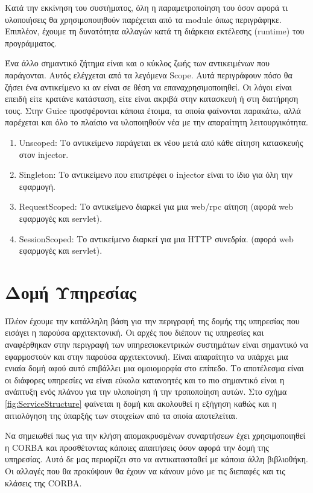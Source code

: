 Κατά την εκκίνηση του συστήματος, όλη η παραμετροποίηση του όσον αφορά 
τι υλοποιήσεις θα χρησιμοποιηθούν παρέχεται από τα module όπως 
περιγράφηκε. Επιπλέον, έχουμε τη δυνατότητα αλλαγών κατά τη διάρκεια 
εκτέλεσης (runtime) του προγράμματος.

Ένα άλλο σημαντικό ζήτημα είναι και ο κύκλος ζωής των αντικειμένων που 
παράγονται. Αυτός ελέγχεται από τα λεγόμενα Scope. Αυτά περιγράφουν πόσο 
θα ζήσει ένα αντικείμενο κι αν είναι σε θέση να επαναχρησιμοποιηθεί. Οι 
λόγοι είναι επειδή είτε κρατάνε κατάσταση, είτε είναι ακριβά στην 
κατασκευή ή στη διατήρηση τους. Στην Guice προσφέρονται κάποια έτοιμα, 
τα οποία φαίνονται παρακάτω, αλλά παρέχεται και όλο το πλαίσιο να 
υλοποιηθούν νέα με την απαραίτητη λειτουργικότητα.

\begin{enumerate}
\item Unscoped: Το αντικείμενο παράγεται εκ νέου μετά από κάθε αίτηση 
κατασκευής στον injector.
\item Singleton: Το αντικείμενο που επιστρέφει ο injector είναι το ίδιο 
για όλη την εφαρμογή.
\item RequestScoped: Το αντικείμενο διαρκεί για μια web/rpc αίτηση 
(αφορά web εφαρμογές και servlet).
\item SessionScoped: Το αντικείμενο διαρκεί για μια HTTP συνεδρία. 
(αφορά web εφαρμογές και servlet).
\setcounter{numberedCntE}{\theenumi}
\end{enumerate}

\section{Δομή Υπηρεσίας}

Πλέον έχουμε την κατάλληλη βάση για την περιγραφή της δομής της 
υπηρεσίας που εισάγει η παρούσα αρχιτεκτονική. Οι αρχές που διέπουν τις 
υπηρεσίες και αναφέρθηκαν στην περιγραφή των υπηρεσιοκεντρικών 
συστημάτων είναι σημαντικό να εφαρμοστούν και στην παρούσα 
αρχιτεκτονική. Είναι απαραίτητο να υπάρχει μια ενιαία δομή αφού αυτό 
επιβάλλει μια ομοιομορφία στο επίπεδο. Το αποτέλεσμα είναι οι διάφορες 
υπηρεσίες να είναι εύκολα κατανοητές και το πιο σημαντικό είναι η 
ανάπτυξη ενός πλάνου για την υλοποίηση ή την τροποποίηση αυτών. Στο σχήμα 
\ref{fig:ServiceStructure} φαίνεται η δομή και ακολουθεί η εξήγηση καθώς και η 
αιτιολόγηση της ύπαρξής των στοιχείων από τα οποία αποτελείται. 

Να σημειωθεί πως για την κλήση απομακρυσμένων συναρτήσεων έχει 
χρησιμοποιηθεί η CORBA και προσθέτοντας κάποιες απαιτήσεις όσον αφορά 
την δομή της υπηρεσίας. Αυτό δε μας περιορίζει στο να αντικατασταθεί με 
κάποια άλλη βιβλιοθήκη. Οι αλλαγές που θα προκύψουν θα έχουν να κάνουν 
μόνο με τις διεπαφές και τις κλάσεις της CORBA.

